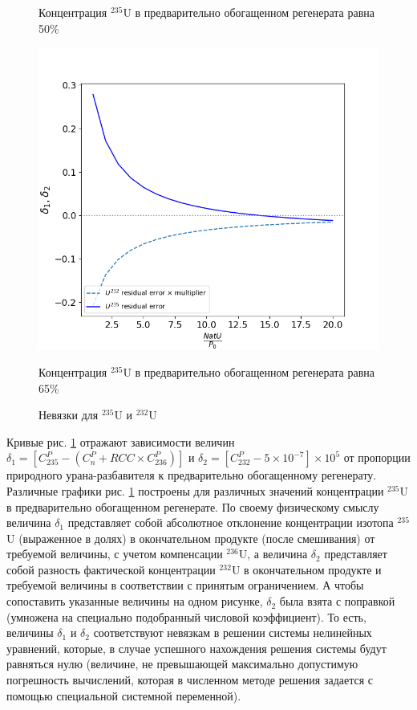 \begin{figure}[ht]
\begin{minipage}{.5\textwidth}
    \caption{Концентрация $^{235}$U в предварительно обогащенном регенерата равна 50\%}
  \end{minipage}
  \begin{minipage}{.5\textwidth}
    \centering
    \includegraphics[width=.8\linewidth]{images/plots/65}  
    \caption{Концентрация $^{235}$U в предварительно обогащенном регенерата равна 65\%}
  \end{minipage}
  \caption{Невязки для $^{235}$U и $^{232}$U}
  \label{fig:deltas_ordinar}
 \end{figure}

Кривые рис. \ref{fig:deltas_ordinar} отражают зависимости величин $\delta_1=\left[C_{235}^P-\left(C_n^P+RCC\times C_{236}^P\right)\right]$ и $\delta_2=\left[C_{232}^P-5\times10^{-7}\right]\times10^5$ от пропорции природного урана-разбавителя к предварительно обогащенному регенерату. Различные графики рис. \ref{fig:deltas_ordinar} построены для различных значений концентрации $^{235}$U в предварительно обогащенном регенерате. По своему физическому смыслу величина $\delta_1$ представляет собой абсолютное отклонение концентрации изотопа $^{235}$U (выраженное в долях) в окончательном продукте (после смешивания) от требуемой величины, с учетом компенсации $^{236}$U, а величина $\delta_2$ представляет собой разность фактической концентрации $^{232}$U в окончательном продукте и требуемой величины в соответствии с принятым ограничением. А чтобы сопоставить указанные величины на одном рисунке, $\delta_2$ была взята с поправкой (умножена на специально подобранный числовой коэффициент). То есть, величины $\delta_1$ и $\delta_2$ соответствуют невязкам в решении системы нелинейных уравнений, которые, в случае успешного нахождения решения системы будут равняться нулю (величине, не превышающей максимально допустимую погрешность вычислений, которая в численном методе решения задается с помощью специальной системной переменной).

